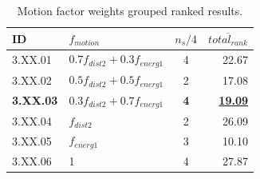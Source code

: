 \begin{table}[ht]
\centering
\footnotesize
\caption{Motion factor weights grouped ranked results.}
\label{tab:motion_weights_grouped_ranked}
\begin{tabular}{@{}llcr@{}}
\hline
    ID & $f_{motion}$ & $n_s/4$ & $\overline{total_{rank}}$ \\
\hline
    3.XX.01 & $0.7f_{dist2} + 0.3f_{energ1}$ & 4 & 22.67 \\
    3.XX.02 & $0.5f_{dist2} + 0.5f_{energ1}$ & 2 & 17.08 \\
    \textbf{3.XX.03} & \textbf{$0.3f_{dist2} + 0.7f_{energ1}$} & \textbf{4} & \textbf{\underline{19.09}} \\
    3.XX.04 & $f_{dist2}$ & 2 & 26.09 \\
    3.XX.05 & $f_{energ1}$ & 3 & 10.10 \\
    3.XX.06 & 1 & 4 & 27.87 \\
\hline
\end{tabular}
\end{table}
